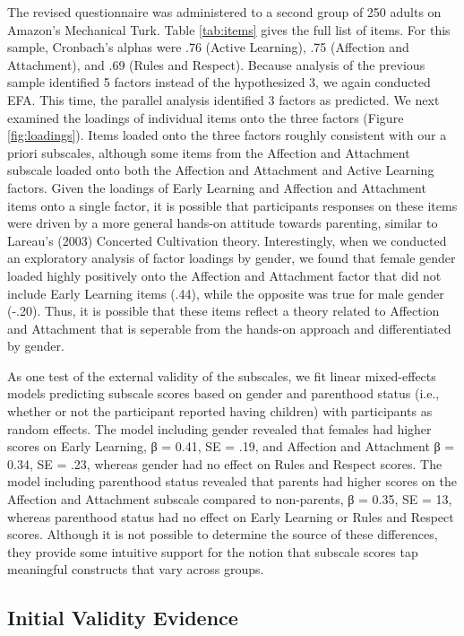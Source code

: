 \documentclass[10pt, letterpaper]{article}
\begin{document}
The revised questionnaire was administered to a second group of 250
adults on Amazon's Mechanical Turk. Table \ref{tab:items} gives the full
list of items. For this sample, Cronbach's alphas were .76 (Active
Learning), .75 (Affection and Attachment), and .69 (Rules and Respect).
Because analysis of the previous sample identified 5 factors instead of
the hypothesized 3, we again conducted EFA. This time, the parallel
analysis identified 3 factors as predicted. We next examined the
loadings of individual items onto the three factors (Figure
\ref{fig:loadings}). Items loaded onto the three factors roughly
consistent with our a priori subscales, although some items from the
Affection and Attachment subscale loaded onto both the Affection and
Attachment and Active Learning factors. Given the loadings of Early
Learning and Affection and Attachment items onto a single factor, it is
possible that participants responses on these items were driven by a
more general hands-on attitude towards parenting, similar to Lareau's
(2003) Concerted Cultivation theory. Interestingly, when we conducted an
exploratory analysis of factor loadings by gender, we found that female
gender loaded highly positively onto the Affection and Attachment factor
that did not include Early Learning items (.44), while the opposite was
true for male gender (-.20). Thus, it is possible that these items
reflect a theory related to Affection and Attachment that is seperable
from the hands-on approach and differentiated by gender.

As one test of the external validity of the subscales, we fit linear
mixed-effects models predicting subscale scores based on gender and
parenthood status (i.e., whether or not the participant reported having
children) with participants as random effects. The model including
gender revealed that females had higher scores on Early Learning, β =
0.41, SE = .19, and Affection and Attachment β = 0.34, SE = .23, whereas
gender had no effect on Rules and Respect scores. The model including
parenthood status revealed that parents had higher scores on the
Affection and Attachment subscale compared to non-parents, β = 0.35, SE
= 13, whereas parenthood status had no effect on Early Learning or Rules
and Respect scores. Although it is not possible to determine the source
of these differences, they provide some intuitive support for the notion
that subscale scores tap meaningful constructs that vary across groups.

\subsection{Initial Validity Evidence}\label{initial-validity-evidence}
\end{document}
